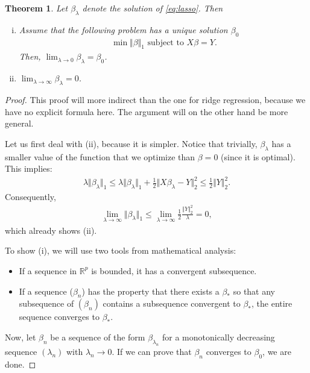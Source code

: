 \documentclass{article}
\newcommand{\R}{\mathbb{R}}
\newtheorem{theorem}{Theorem}
\newcommand{\norm}[1]{\Vert #1 \Vert}
\begin{document}
\begin{theorem}
    Let $\beta_\lambda$ denote the solution of \eqref{eq:lasso}. Then
    \begin{enumerate}[(i)]
        \item Assume that the following problem has a unique solution $\beta_0$
        \begin{align}
            \min \norm{\beta}_1 \text{ subject to } X\beta = Y. \label{eq:BP}
        \end{align}
        Then, $\lim_{\lambda \to 0} \beta_\lambda = \beta_0$.
        \item $\lim_{\lambda \to \infty} \beta_\lambda = 0$.
    \end{enumerate}

\end{theorem}
\begin{proof}
    This proof will more indirect than the one for ridge regression, because we have no explicit formula here. The argument will on the other hand be more general.

    Let us first deal with (ii), because it is simpler. Notice that trivially, $\beta_\lambda$ has a smaller value of the function that we optimize than $\beta=0$ (since it is optimal). This implies:
    \begin{align*}
        \lambda \norm{\beta_\lambda}_1 \leq \lambda \norm{\beta_\lambda}_1  + \tfrac{1}{2}\norm{X\beta_\lambda - Y }_2^2 \leq \tfrac{1}{2}\norm{Y}_2^2.
    \end{align*}
    Consequently,
    \begin{align*}
        \lim_{\lambda \to \infty} \norm{\beta_\lambda}_1 \leq \lim_{\lambda \to \infty} \tfrac{1}{2}\frac{\norm{Y}_2^2}{\lambda} = 0,
    \end{align*}
    which already shows (ii).
 
    To show (i), we will use two tools from mathematical analysis:
    \begin{itemize}
        \item If a sequence in $\R^p$ is bounded, it has a convergent subsequence.
        \item If a sequence ($\beta_n$) has the property that there exists a $\beta_*$ so that any subsequence of $(\beta_n)$ contains a subsequence convergent to $\beta_*$, the entire sequence converges to $\beta_*$.
    \end{itemize}
    Now, let $\beta_n$ be a sequence of the form $\beta_{\lambda_n}$ for a monotonically decreasing sequence $(\lambda_n)$ with $\lambda_n \to 0$. If we can prove that $\beta_n$ converges to $\beta_0$, we are done.


\end{proof}
\end{document}

